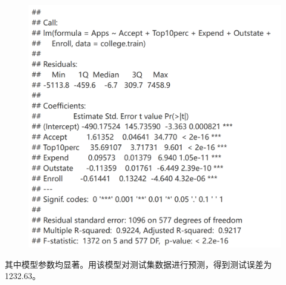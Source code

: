 \documentclass[12pt,a4paper]{article}
\begin{document}
    \begin{figure}[H]
        \centering
        \includegraphics[scale=0.25]{Linear.png}
    \end{figure}
    其中模型参数均显著。用该模型对测试集数据进行预测，得到测试误差为1232.63。
\end{document}
